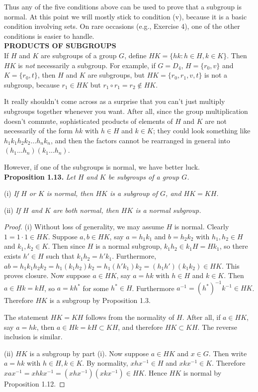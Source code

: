 \documentclass[leqno]{book}
\begin{document}
\noindent Thus any of the five conditions above can be used to prove that a subgroup is normal.  At this point we will mostly stick to condition (v), because it is a basic condition involving sets.  On rare occasions (e.g., Exercise 4), one of the other conditions is easier to handle.\\

\noindent\textbf{PRODUCTS OF SUBGROUPS}\\

\noindent If $H$ and $K$ are subgroups of a group $G$, define $HK=\{hk:h\in H,k\in K\}$.  Then $HK$ is \emph{not} necessarily a subgroup.  For example, if $G=D_4$, $H=\{r_0,v\}$ and $K=\{r_0,t\}$, then $H$ and $K$ are subgroups, but $HK=\{r_0,r_1,v,t\}$ is not a subgroup, because $r_1\in HK$ but $r_1\circ r_1=r_2\notin HK$.

It really shouldn't come across as a surprise that you can't just multiply subgroups together whenever you want.  After all, since the group multiplication doesn't commute, sophisticated products of elements of $H$ and $K$ are not necessarily of the form $hk$ with $h\in H$ and $k\in K$; they could look something like $h_1k_1h_2k_2\dots h_nk_n$, and then the factors cannot be rearranged in general into $(h_1\dots h_n)(k_1\dots h_n)$.

However, if one of the subgroups is normal, we have better luck.\\

\noindent\textbf{Proposition 1.13.} \emph{Let $H$ and $K$ be subgroups of a group $G$.}

(i) \emph{If $H$ or $K$ is normal, then $HK$ is a subgroup of $G$, and $HK=KH$.}

(ii) \emph{If $H$ and $K$ are both normal, then $HK$ is a normal subgroup.}
\begin{proof}
(i) Without loss of generality, we may assume $H$ is normal.  Clearly $1=1\cdot 1\in HK$.  Suppose $a,b\in HK$, say $a=h_1k_1$ and $b=h_2k_2$ with $h_1,h_2\in H$ and $k_1,k_2\in K$.  Then since $H$ is a normal subgroup, $k_1h_2\in k_1H=Hk_1$, so there exists $h'\in H$ such that $k_1h_2=h'k_1$.  Furthermore, $ab=h_1k_1h_2k_2=h_1(k_1h_2)k_2=h_1(h'k_1)k_2=(h_1h')(k_1k_2)\in HK$.  This proves closure.  Now suppose $a\in HK$, say $a=hk$ with $h\in H$ and $k\in K$.  Then $a\in Hk=kH$, so $a=kh^*$ for some $h^*\in H$.  Furthermore $a^{-1}=(h^*)^{-1}k^{-1}\in HK$.  Therefore $HK$ is a subgroup by Proposition 1.3.

The statement $HK=KH$ follows from the normality of $H$.  After all, if $a\in HK$, say $a=hk$, then $a\in Hk=kH\subset KH$, and therefore $HK\subset KH$.  The reverse inclusion is similar.

(ii) $HK$ is a subgroup by part (i).  Now suppose $a\in HK$ and $x\in G$.  Then write $a=hk$ with $h\in H,k\in K$.  By normality, $xhx^{-1}\in H$ and $xkx^{-1}\in K$.  Therefore $xax^{-1}=xhkx^{-1}=(xhx^{-1})(xkx^{-1})\in HK$.  Hence $HK$ is normal by Proposition 1.12.
\end{proof}
\end{document}
